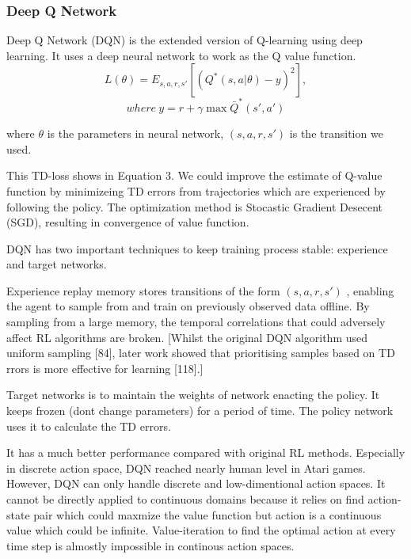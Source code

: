 \documentclass[11pt,twocolumn]{jarticle} %
\begin{document}
\subsubsection{Deep Q Network}

Deep Q Network (DQN) \cite{dqn}  is the extended version of Q-learning using deep learning. It uses a deep neural network to work as the Q value function. 
\begin{equation}
L(\theta) = E_{s,a,r,s'}[(Q^*(s, a|\theta) - y)^2],  
\end{equation}
$$where\ y = r + \gamma\max \bar{Q}^*(s', a')$$

where $\theta$ is the parameters in neural network, $(s,a,r,s')$ is the transition we used. \par

This TD-loss shows in Equation 3. We could improve the estimate of Q-value function by minimizeing TD errors from trajectories which are experienced by following the policy. The optimization method is Stocastic Gradient Desecent (SGD), resulting in convergence of value function. \par
DQN has two important techniques to keep training process stable: experience and target networks.\par
Experience replay \cite{replay} memory stores transitions of the form $(s,a,r,s')$ , enabling the agent to sample from and train on previously observed data offline. By sampling from a large memory, the temporal correlations that could adversely affect RL algorithms are broken. [Whilst the original DQN algorithm used uniform sampling [84], later work showed that prioritising samples based on TD  rrors is more effective for learning [118].] \par
Target networks \cite{qlearning} is to maintain the weights of network enacting the policy. It keeps frozen (dont change parameters) for a period of time. The policy network uses it to calculate the TD errors. \par

It has a much better performance compared with original RL methods. Especially in discrete action space, DQN reached nearly human level in Atari games. However, DQN can only handle discrete and low-dimentional action spaces. It cannot be directly applied to continuous domains because it relies on find action-state pair which could maxmize the value function but action is a continuous value which could be infinite. Value-iteration to find the optimal action at every time step is almostly impossible in continous action spaces. 
\end{document}
